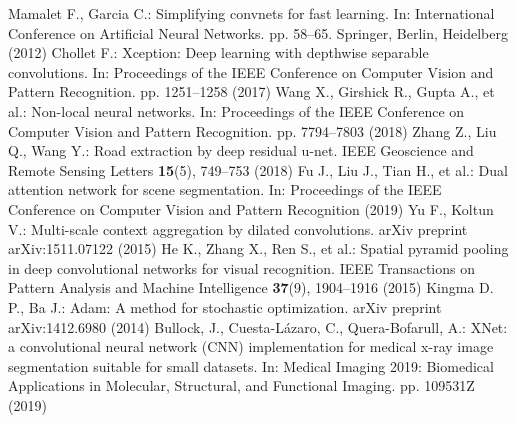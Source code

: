 \documentclass[runningheads]{llncs}
\begin{document}
\begin{thebibliography}{99}
	Mamalet F., Garcia C.: Simplifying convnets for fast learning. In: International Conference on Artificial Neural Networks. pp. 58--65. Springer, Berlin, Heidelberg (2012)
	\bibitem{[14]}
	Chollet F.: Xception: Deep learning with depthwise separable convolutions. In: Proceedings of the IEEE Conference on Computer Vision and Pattern Recognition. pp. 1251--1258 (2017)
	\bibitem{[15]}
	Wang X., Girshick R., Gupta A., et al.: Non-local neural networks. In: Proceedings of the IEEE Conference on Computer Vision and Pattern Recognition. pp. 7794--7803 (2018)
	\bibitem{[16]}
	Zhang Z., Liu Q., Wang Y.: Road extraction by deep residual u-net. IEEE Geoscience and Remote Sensing Letters \textbf{15}(5), 749--753 (2018)
	\bibitem{[19]}
	Fu J., Liu J., Tian H., et al.: Dual attention network for scene segmentation. In: Proceedings of the IEEE Conference on Computer Vision and Pattern Recognition (2019)
	\bibitem{[21]}
	Yu F., Koltun V.: Multi-scale context aggregation by dilated convolutions. arXiv preprint arXiv:1511.07122 (2015)
	\bibitem{[22]}
	He K., Zhang X., Ren S., et al.: Spatial pyramid pooling in deep convolutional networks for visual recognition. IEEE Transactions on Pattern Analysis and Machine Intelligence \textbf{37}(9), 1904--1916 (2015)
	\bibitem{[23]}
	Kingma D. P., Ba J.: Adam: A method for stochastic optimization. arXiv preprint arXiv:1412.6980 (2014)
	\bibitem{[24]}
	Bullock, J., Cuesta-Lázaro, C., Quera-Bofarull, A.: XNet: a convolutional neural network (CNN) implementation for medical x-ray image segmentation suitable for small datasets. In: Medical Imaging 2019: Biomedical Applications in Molecular, Structural, and Functional Imaging. pp. 109531Z (2019)

\end{thebibliography}
\end{document}
